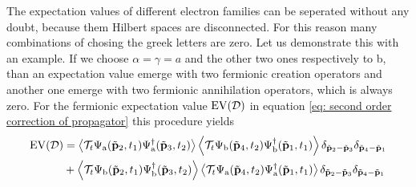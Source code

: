 The expectation values of different electron families can be seperated without any doubt, because them Hilbert spaces are disconnected.
For this reason many combinations of chosing the greek letters are zero.
Let us demonstrate this with an example.
If we choose $\alpha = \gamma = a$ and the other two ones respectively to b, than an expectation value emerge with two fermionic creation operators and another one emerge with two fermionic annihilation operators, which is always zero.
For the fermionic expectation value $\mathrm{EV}(\mathcal{D})$ in equation \eqref{eq: second order correction of propagator} this procedure yields
%
\begin{align}
	\mt{EV}(\mathcal{D}) &= 
		\expval{
			\mathcal{T}_{t}
			\Psi_{\mt{a}}(\tilde{\vb{p}}_{2},t_{1})
			\Psi_{\mt{a}}^{\dag}(\tilde{\vb{p}}_{3},t_{2})
		}
		\expval{
			\mathcal{T}_{t}
			\Psi_{\mt{b}}(\tilde{\vb{p}}_{4},t_{2})
			\Psi_{\mt{b}}^{\dag}(\tilde{\vb{p}}_{1},t_{1})
		}
		\delta_{\tilde{\vb{p}}_{2}-\tilde{\vb{p}}_{3}}
		\delta_{\tilde{\vb{p}}_{4}-\tilde{\vb{p}}_{1}}
		\notag \\
		&+
		\expval{
			\mathcal{T}_{t}
			\Psi_{\mt{b}}(\tilde{\vb{p}}_{2},t_{1})
			\Psi_{\mt{b}}^{\dag}(\tilde{\vb{p}}_{3},t_{2})
		}
		\expval{
			\mathcal{T}_{t}
			\Psi_{\mt{a}}(\tilde{\vb{p}}_{4},t_{2})
			\Psi_{\mt{a}}^{\dag}(\tilde{\vb{p}}_{1},t_{1})
		}
		\delta_{\tilde{\vb{p}}_{2}-\tilde{\vb{p}}_{3}}
		\delta_{\tilde{\vb{p}}_{4}-\tilde{\vb{p}}_{1}}
		\label{eq: expectation value of second order correction}
\end{align}
%